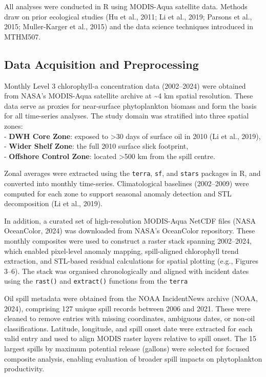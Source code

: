 \documentclass[
  11pt,
]{article}
\begin{document}
All analyses were conducted in R using MODIS-Aqua satellite data.
Methods draw on prior ecological studies (Hu et al., 2011; Li et al.,
2019; Parsons et al., 2015; Muller-Karger et al., 2015) and the data
science techniques introduced in MTHM507.

\subsection{Data Acquisition and
Preprocessing}\label{data-acquisition-and-preprocessing}

Monthly Level 3 chlorophyll-a concentration data (2002--2024) were
obtained from NASA's MODIS-Aqua satellite archive at \textasciitilde4 km
spatial resolution. These data serve as proxies for near-surface
phytoplankton biomass and form the basis for all time-series analyses.
The study domain was stratified into three spatial zones:\\
- \textbf{DWH Core Zone}: exposed to \textgreater30 days of surface oil
in 2010 (Li et al., 2019),\\
- \textbf{Wider Shelf Zone}: the full 2010 surface slick footprint,\\
- \textbf{Offshore Control Zone}: located \textgreater500 km from the
spill centre.

Zonal averages were extracted using the \texttt{terra}, \texttt{sf}, and
\texttt{stars} packages in R, and converted into monthly time-series.
Climatological baselines (2002--2009) were computed for each zone to
support seasonal anomaly detection and STL decomposition (Li et al.,
2019).

In addition, a curated set of high-resolution MODIS-Aqua NetCDF files
(NASA OceanColor, 2024) was downloaded from NASA's OceanColor
repository. These monthly composites were used to construct a raster
stack spanning 2002--2024, which enabled pixel-level anomaly mapping,
spill-aligned chlorophyll trend extraction, and STL-based residual
calculations for spatial plotting (e.g., Figures 3--6). The stack was
organised chronologically and aligned with incident dates using the
\texttt{rast()} and \texttt{extract()} functions from the \texttt{terra}

Oil spill metadata were obtained from the NOAA IncidentNews archive
(NOAA, 2024), comprising 127 unique spill records between 2006 and 2021.
These were cleaned to remove entries with missing coordinates, ambiguous
dates, or non-oil classifications. Latitude, longitude, and spill onset
date were extracted for each valid entry and used to align MODIS raster
layers relative to spill onset. The 15 largest spills by maximum
potential release (gallons) were selected for focused composite
analysis, enabling evaluation of broader spill impacts on phytoplankton
productivity.
\end{document}
